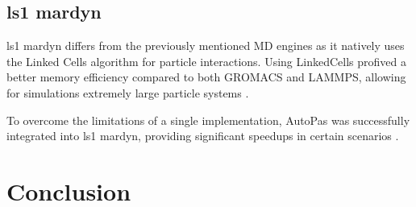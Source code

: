 \documentclass[conference]{IEEEtran}
\begin{document}
\subsection{ls1 mardyn}

ls1 mardyn differs from the previously mentioned MD engines as it natively uses the Linked Cells algorithm for particle interactions. Using LinkedCells profived a better memory efficiency compared to both GROMACS and LAMMPS, allowing for simulations extremely large particle systems \cite{tchipev2019twe}.

To overcome the limitations of a single implementation, AutoPas was successfully integrated into ls1 mardyn, providing significant speedups in certain scenarios \cite{SECKLER2021101296}.


\newpage

\section{Conclusion}








\newpage
\newpage
\tableofcontents
\end{document}
